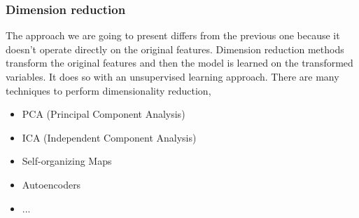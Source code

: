 \documentclass[../main.tex]{subfiles}
\begin{document}
\subsubsection{Dimension reduction}
The approach we are going to present differs from the previous one because it doesn't operate directly on the original features. Dimension reduction methods transform the original features and then the model is learned on the transformed variables. It does so with an unsupervised learning approach. There are many techniques to perform dimensionality reduction,
\begin{itemize}
    \item PCA (Principal Component Analysis)
    \item ICA (Independent Component Analysis)
    \item Self-organizing Maps
    \item Autoencoders
    \item ...
\end{itemize}
\end{document}
